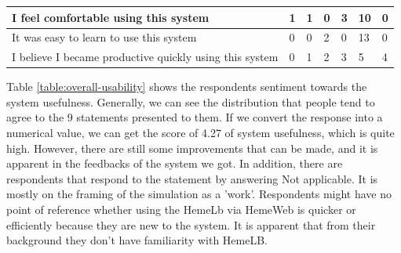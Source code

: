 \begin{center}
{\begin{tabular}{|l|l|l|l|l|l|l|}
I feel comfortable using this system                                                                      & 1                                                            & 1        & 0       & 3     & 10                                                        & 0                                                         \\ \hline
It was easy to learn to use this system                                                                   & 0                                                            & 0        & 2       & 0     & 13                                                        & 0                                                         \\ \hline
I believe I became productive quickly using this system                                                   & 0                                                            & 1        & 2       & 3     & 5                                                         & 4                                                         \\ \hline
\end{tabular}
}
\end{center}
\vspace{1cm}

Table \ref{table:overall-usability} shows the respondents sentiment towards the system usefulness. Generally, we can see the distribution that people tend to agree to the 9 statements presented to them. If we convert the response into a numerical value, we can get the score of 4.27 of system usefulness, which is quite high. However, there are still some improvements that can be made, and it is apparent in the feedbacks of the system we got. In addition, there are respondents that respond to the statement by answering Not applicable. It is mostly on the framing of the simulation as a 'work'. Respondents might have no point of reference whether using the HemeLb via HemeWeb is quicker or efficiently because they are new to the system. It is apparent that from their background they don't  have familiarity with HemeLB.



